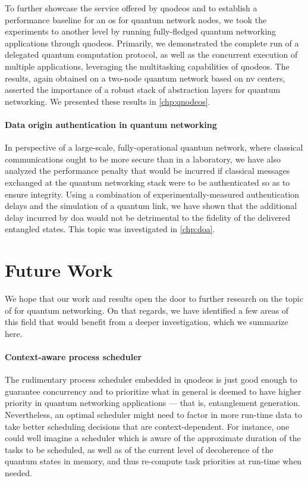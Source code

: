 To further showcase the service offered by \acrshort{qnodeos} and to establish a performance
baseline for an \acrshort{os} for quantum network nodes, we took the experiments to another level by
running fully-fledged quantum networking applications through \acrshort{qnodeos}. Primarily, we
demonstrated the complete run of a delegated quantum computation protocol, as well as the concurrent
execution of multiple applications, leveraging the multitasking capabilities of \acrshort{qnodeos}.
The results, again obtained on a two-node quantum network based on \acrlong{nv} centers, asserted
the importance of a robust stack of abstraction layers for quantum networking.  We presented these results in \cref{chp:qnodeos}.

\paragraph{Data origin authentication in quantum networking}

In perspective of a large-scale, fully-operational quantum network, where classical communications
ought to be more secure than in a laboratory, we have also analyzed the performance penalty that
would be incurred if classical messages exchanged at the quantum networking stack were to be
authenticated so as to ensure integrity. Using a combination of experimentally-measured
authentication delays and the simulation of a quantum link, we have shown that the additional delay
incurred by \acrlong{doa} would not be detrimental to the fidelity of the delivered entangled
states. This topic was investigated in \cref{chp:doa}.

\section{Future Work}

We hope that our work and results open the door to further research on the topic of 
for quantum networking. On that regards, we have identified a few areas of this field that would
benefit from a deeper investigation, which we summarize here.

\paragraph{Context-aware process scheduler}

The rudimentary process scheduler embedded in \acrshort{qnodeos} is just good enough to guarantee
concurrency and to prioritize what in general is deemed to have higher priority in quantum
networking applications --- that is, entanglement generation. Nevertheless, an optimal scheduler
might need to factor in more run-time data to take better scheduling decisions that are
context-dependent. For instance, one could well imagine a scheduler which is aware of the
approximate duration of the tasks to be scheduled, as well as of the current level of decoherence of
the quantum states in memory, and thus re-compute task priorities at run-time when needed.

